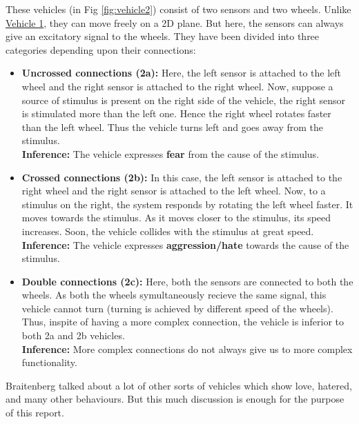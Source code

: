 \documentclass[main.tex]{subfiles}
\begin{document}
        These vehicles (in Fig \ref{fig:vehicle2}) consist of two sensors and two wheels. Unlike \hyperref[sec:Vehicle_1]{Vehicle 1}, they can move freely on a 2D plane. But here, the sensors can always give an excitatory signal to the wheels. They have been divided into three categories depending upon their connections:

        \begin{itemize}
            \item \textbf{Uncrossed connections (2a):} Here, the left sensor is attached to the left wheel and the right sensor is attached to the right wheel. Now, suppose a source of stimulus is present on the right side of the vehicle, the right sensor is stimulated more than the left one. Hence the right wheel rotates faster than the left wheel. Thus the vehicle turns left and goes away from the stimulus.\\
            \textbf{Inference:} The vehicle expresses \textbf{fear} from the cause of the stimulus.
            \item \textbf{Crossed connections (2b):} In this case, the left sensor is attached to the right wheel and the right sensor is attached to the left wheel. Now, to a stimulus on the right, the system responds by rotating the left wheel faster. It moves towards the stimulus. As it moves closer to the stimulus, its speed increases. Soon, the vehicle collides with the stimulus at great speed.\\
            \textbf{Inference:} The vehicle expresses \textbf{aggression/hate} towards the cause of the stimulus.
            \item \textbf{Double connections (2c):} Here, both the sensors are connected to both the wheels. As both the wheels symultaneously recieve the same signal, this vehicle cannot turn (turning is achieved by different speed of the wheels). Thus, inspite of having a more complex connection, the vehicle is inferior to both 2a and 2b vehicles.\\
            \textbf{Inference:} More complex connections do not always give us to more complex functionality.
        \end{itemize}
    
    Braitenberg talked about a lot of other sorts of vehicles which show love, hatered, and many other behaviours. But this much discussion is enough for the purpose of this report.
\end{document}
